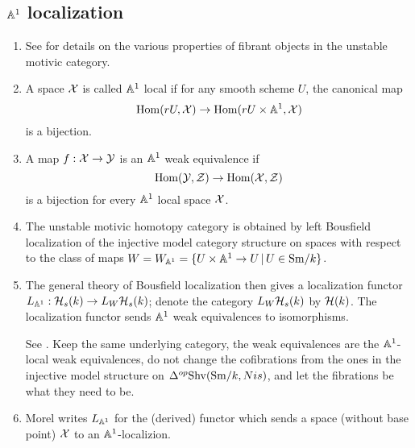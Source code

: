 \documentclass{amsart}%
\begin{document}
\subsection{$\mathbb{A}^1$ localization}
\begin{enumerate}
    \item See \cite[Prop 2.3.3.]{Pelaez} for details on the various properties
of fibrant objects in the unstable motivic category.


\item 

\begin{definition} A space $\mathcal{X}$ is called $\mathbb{A}^1$ local if for any
  smooth scheme $U$, the canonical map
  \begin{equation*}
    \operatorname{Hom}(rU, \mathcal{X}) \to \operatorname{Hom}(rU\times \mathbb{A}^1, \mathcal{X})
  \end{equation*}
  is a bijection. 
\end{definition}

  \item 

\begin{definition}
  A map $f: \mathcal{X} \to \mathcal{Y}$ is an $\mathbb{A}^1$ weak equivalence if 
  \begin{equation*}
    \operatorname{Hom}(\mathcal{Y}, \mathcal{Z}) \to \operatorname{Hom}(\mathcal{X}, \mathcal{Z})
  \end{equation*}
  is a bijection for every $\mathbb{A}^1$ local space $\mathcal{X}$.
\end{definition}

  \item The unstable motivic homotopy category is obtained by left
Bousfield localization of the injective model category structure on
spaces with respect to the class of maps
$W = W_{\mathbb{A}^1} = \{ U \times \mathbb{A}^1 \to U \, \vert \, U \in \mathrm{Sm}/k\}$.

  \item The general theory of Bousfield localization then gives a
localization functor $L_{\mathbb{A}^1} : \mathcal{H}_s(k) \to L_{W}\mathcal{H}_s(k)$;
denote the category $L_{W}\mathcal{H}_s(k)$ by $\mathcal{H}(k)$. The localization
functor sends $\mathbb{A}^1$ weak equivalences to isomorphisms. 

See \cite[Definition 3.3.1]{Hir}. Keep the same underlying category,
the weak equivalences are the $\mathbb{A}^1$-local weak equivalences, do not
change the cofibrations from the ones in the injective model
structure on $\Delta^{op}\mathrm{Shv}(\mathrm{Sm}/k,Nis)$, and let the fibrations be
what they need to be. 

  \item Morel writes $L_{\mathbb{A}^1}$ for the (derived) functor which
sends a space (without base point) $\mathcal{X}$ to an $\mathbb{A}^1$-localizion. 


\end{enumerate}
\end{document}

